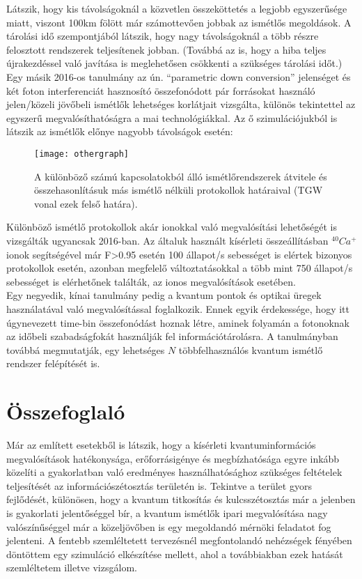 Látszik, hogy kis távolságoknál a közvetlen összeköttetés a legjobb egyszerűsége miatt, viszont 100km fölött már számottevően jobbak az ismétlős megoldások. A tárolási idő szempontjából látszik, hogy nagy távolságoknál a több részre felosztott rendszerek teljesítenek jobban. (Továbbá az is, hogy a hiba teljes újrakezdéssel való javítása is meglehetősen csökkenti a szükséges tárolási időt.)\\
Egy másik 2016-os tanulmány \cite{krovi2016practical} az ún. ``parametric down conversion'' jelenséget és két foton interferenciát hasznosító  összefonódott pár forrásokat használó jelen/közeli jövőbeli ismétlők lehetséges korlátjait vizsgálta, különös tekintettel az egyszerű megvalósíthatóságra a mai technológiákkal. Az ő szimulációjukból is látszik az ismétlők előnye nagyobb távolságok esetén:\\
\begin{figure}[H]
\centering
\texttt{[image: othergraph]}
\caption[Ismétlő teljesítményhatár]{A különböző számú kapcsolatokból álló ismétlőrendszerek átvitele és összehasonlításuk más ismétlő nélküli protokollok határaival (TGW vonal ezek felső határa).
}
\end{figure}
Különböző ismétlő protokollok akár ionokkal való megvalósítási lehetőségét is vizsgálták \cite{pfister2016quantum} ugyancsak 2016-ban. Az általuk használt kísérleti összeállításban $^{40}Ca^+$ ionok segítségével már F>0.95 esetén 100 állapot/s sebességet is elértek bizonyos protokollok esetén, azonban megfelelő változtatásokkal a több mint 750 állapot/s sebességet is elérhetőnek találták, az ionos megvalósítások esetében.\\

Egy negyedik, kínai tanulmány \cite{li2016heralded} pedig a kvantum pontok és optikai üregek használatával való megvalósítással foglalkozik. Ennek egyik érdekessége, hogy itt úgynevezett time-bin összefonódást hoznak létre, aminek folyamán a fotonoknak az időbeli szabadságfokát használják fel információtárolásra. 
A tanulmányban továbbá megmutatják, egy lehetséges $N$ többfelhasználós kvantum ismétlő rendszer felépítését is.

\section{Összefoglaló}

Már az említett esetekből is látszik, hogy a kísérleti kvantuminformációs megvalósítások hatékonysága, erőforrásigénye és megbízhatósága egyre inkább közelíti a gyakorlatban való eredményes használhatósághoz szükséges feltételek teljesítését az információszétosztás területén is. Tekintve a terület gyors fejlődését, különösen, hogy a kvantum titkosítás és kulcsszétosztás már a jelenben is gyakorlati jelentőséggel bír, a kvantum ismétlők ipari megvalósítása nagy valószínűséggel már a közeljövőben is egy megoldandó mérnöki feladatot fog jelenteni. A fentebb szemléltetett tervezésnél megfontolandó nehézségek fényében döntöttem egy szimuláció elkészítése mellett, ahol a továbbiakban ezek hatását szemléltetem illetve vizsgálom.

